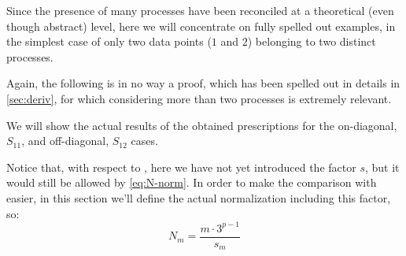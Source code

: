 Since the presence of many processes have been reconciled at a theoretical
(even though abstract) level, here we will concentrate on fully spelled out
examples, in the simplest case of only two data points ($1$ and $2$) belonging
to two distinct processes.

Again, the following is in no way a proof, which has been spelled out in
details in \cref{sec:deriv}, for which considering more than two processes is
extremely relevant.

We will show the actual results of the obtained prescriptions for the
on-diagonal, $S_{11}$, and off-diagonal, $S_{12}$ cases.

Notice that, with respect to \cite{NNPDF:2019ubu}, here we have not yet
introduced the factor $s$, but it would still be allowed by \cref{eq:N-norm}.
In order to make the comparison with \cite{NNPDF:2019ubu} easier, in this
section we'll define the actual normalization including this factor, so: 
\begin{equation}
    N_m = \frac{m \cdot 3^{p-1}}{s_m}
\end{equation}

